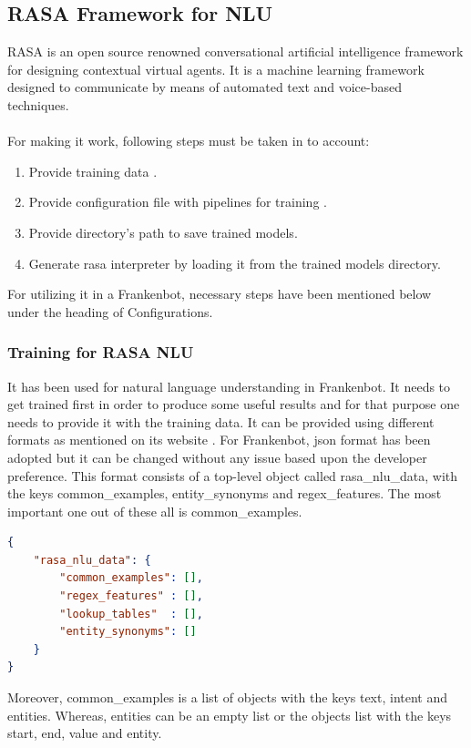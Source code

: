 \subsection{RASA Framework for NLU \label{subsec:rasanlu}}
RASA is an open source renowned conversational artificial intelligence framework for designing contextual virtual agents. It is a machine learning framework designed to communicate by means of automated text and voice-based techniques. \cite{rasa}
\\~\\
For making it work, following steps must be taken in to account:
\begin{enumerate}
    \item Provide training data \cite{rasatrainingdata}.
    \item Provide configuration file with pipelines for training \cite{rasapipeline}.
    \item Provide directory's path to save trained models.
    \item Generate rasa interpreter by loading it from the trained models directory.
\end{enumerate}
For utilizing it in a Frankenbot, necessary steps have been mentioned below under the heading of Configurations.
 
\subsubsection*{Training for RASA NLU}
It has been used for natural language understanding in Frankenbot. It needs to get trained first in order to produce some useful results and for that purpose one needs to provide it with the training data. It can be provided using different formats as mentioned on its website \cite{rasatrainingdata}. For Frankenbot, json format has been adopted but it can be changed without any issue based upon the developer preference. This format consists of a top-level object called rasa\_nlu\_data, with the keys common\_examples, entity\_synonyms and regex\_features. The most important one out of these all is common\_examples.

\begin{lstlisting}[language=json,firstnumber=1]
{
    "rasa_nlu_data": {
        "common_examples": [],
        "regex_features" : [],
        "lookup_tables"  : [],
        "entity_synonyms": []
    }
}
\end{lstlisting}
 Moreover, common\_examples is a list of objects with the keys text, intent and entities. Whereas, entities can be an empty list or the objects list with the keys start, end, value and entity.
 
